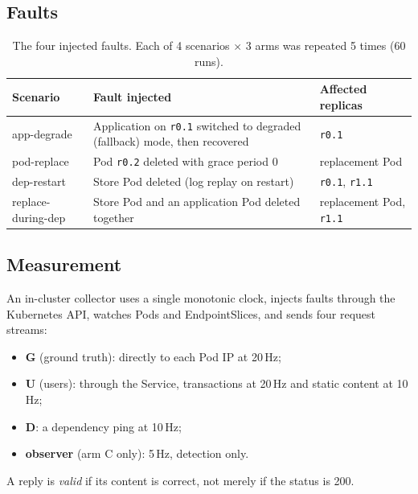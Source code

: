 \documentclass[11pt,a4paper]{article}
\begin{document}
\subsection{Faults}
\begin{table}[H]
\centering\small
\begin{tabularx}{\linewidth}{@{}l X l@{}}
\toprule
Scenario & Fault injected & Affected replicas\\
\midrule
app-degrade & Application on \texttt{r0.1} switched to degraded (fallback) mode, then recovered & \texttt{r0.1}\\
pod-replace & Pod \texttt{r0.2} deleted with grace period 0 & replacement Pod\\
dep-restart & Store Pod deleted (log replay on restart) & \texttt{r0.1}, \texttt{r1.1}\\
replace-during-dep & Store Pod and an application Pod deleted together & replacement Pod, \texttt{r1.1}\\
\bottomrule
\end{tabularx}
\caption{The four injected faults. Each of 4 scenarios $\times$ 3 arms was repeated 5 times (60 runs).}
\label{tab:faults}
\end{table}

\subsection{Measurement}
An in-cluster collector uses a single monotonic clock, injects faults through the Kubernetes API, watches Pods and EndpointSlices, and sends four request streams:
\begin{itemize}
\item \textbf{G} (ground truth): directly to each Pod IP at 20\,Hz;
\item \textbf{U} (users): through the Service, transactions at 20\,Hz and static content at 10\,Hz;
\item \textbf{D}: a dependency ping at 10\,Hz;
\item \textbf{observer} (arm C only): 5\,Hz, detection only.
\end{itemize}
A reply is \emph{valid} if its content is correct, not merely if the status is 200.
\end{document}
